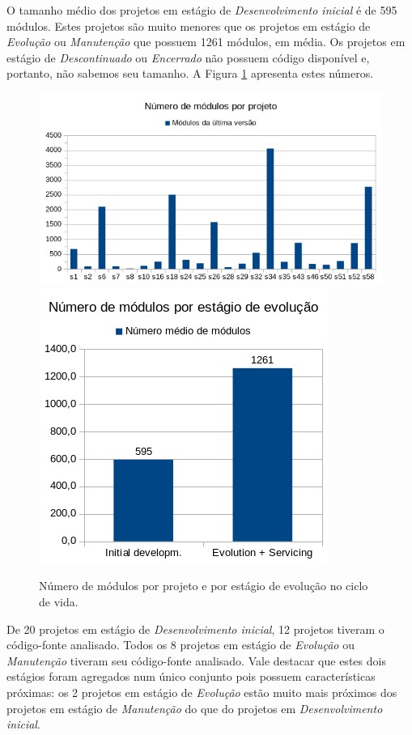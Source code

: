 O tamanho médio dos projetos em estágio de {\it Desenvolvimento inicial} é de 595
módulos. Estes projetos são muito menores que os projetos em estágio de {\it Evolução} 
ou  {\it Manutenção} que possuem 1261 módulos, em média. 
Os projetos em estágio de {\it Descontinuado} ou {\it Encerrado} não possuem código disponível e,
portanto, não sabemos seu tamanho.
A Figura \ref{modules-average} apresenta estes números.

\begin{figure}[ht]
  \center
  \includegraphics[scale=0.6]{imagens/modules-total.png}
  \includegraphics[scale=0.6]{imagens/modules-average.png}
  \caption{Número de módulos por projeto e por estágio de evolução no ciclo de vida.}
  \label{modules-average}
\end{figure}

De 20 projetos em estágio de {\it Desenvolvimento inicial}, 
12 projetos tiveram o código-fonte analisado. 
Todos os 8 projetos em estágio de {\it Evolução} ou {\it Manutenção}
tiveram seu código-fonte analisado.
Vale destacar que estes dois estágios foram agregados num único conjunto 
pois possuem características próximas: 
os 2 projetos em estágio de {\it Evolução} estão
muito mais próximos dos projetos em estágio de {\it Manutenção} do que 
do projetos em {\it Desenvolvimento inicial}. 

